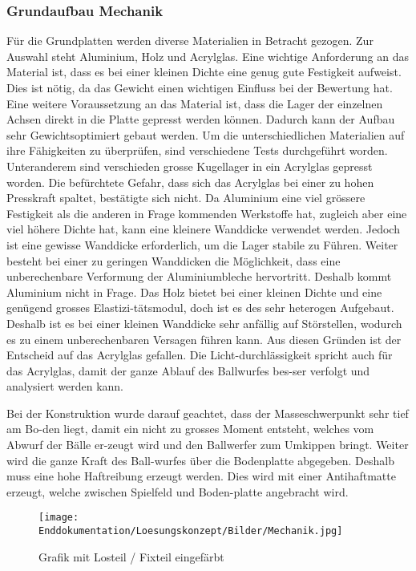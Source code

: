 ﻿\subsubsection{Grundaufbau Mechanik}
Für die Grundplatten werden diverse Materialien in Betracht gezogen. Zur Auswahl steht Aluminium, Holz und Acrylglas. Eine wichtige Anforderung an das Material ist, dass es bei einer kleinen Dichte eine genug gute Festigkeit aufweist. Dies ist nötig, da das Gewicht einen wichtigen Einfluss bei der Bewertung hat. Eine weitere Voraussetzung an das Material ist, dass die Lager der einzelnen Achsen direkt in die Platte gepresst werden können. Dadurch kann der Aufbau sehr Gewichtsoptimiert gebaut werden. Um die unterschiedlichen Materialien auf ihre Fähigkeiten zu überprüfen, sind verschiedene Tests durchgeführt worden. Unteranderem sind verschieden grosse Kugellager in ein Acrylglas gepresst worden. Die befürchtete Gefahr, dass sich das Acrylglas bei einer zu hohen Presskraft spaltet, bestätigte sich nicht. Da Aluminium eine viel grössere Festigkeit als die anderen in Frage kommenden Werkstoffe hat, zugleich aber eine viel höhere Dichte hat, kann eine kleinere Wanddicke verwendet werden. Jedoch ist eine gewisse Wanddicke erforderlich, um die Lager stabile zu Führen. Weiter besteht bei einer zu geringen Wanddicken die Möglichkeit, dass eine unberechenbare Verformung der Aluminiumbleche hervortritt. Deshalb kommt Aluminium nicht in Frage. Das Holz bietet bei einer kleinen Dichte und eine genügend grosses Elastizi-tätsmodul, doch ist es des sehr heterogen Aufgebaut. Deshalb ist es bei einer kleinen Wanddicke sehr anfällig auf Störstellen, wodurch es zu einem unberechenbaren Versagen führen kann. Aus diesen Gründen ist der Entscheid auf das Acrylglas gefallen. Die Licht-durchlässigkeit spricht auch für das Acrylglas, damit der ganze Ablauf des Ballwurfes bes-ser verfolgt und analysiert werden kann. 

Bei der Konstruktion wurde darauf geachtet, dass der Masseschwerpunkt sehr tief am Bo-den liegt, damit ein nicht zu grosses Moment entsteht, welches vom Abwurf der Bälle er-zeugt wird und den Ballwerfer zum Umkippen bringt. Weiter wird die ganze Kraft des Ball-wurfes über die Bodenplatte abgegeben. Deshalb muss eine hohe Haftreibung erzeugt werden. Dies wird mit einer Antihaftmatte erzeugt, welche zwischen Spielfeld und Boden-platte angebracht wird.
\begin{figure}
		\centering
		\texttt{[image: Enddokumentation/Loesungskonzept/Bilder/Mechanik.jpg]}
		\caption{Grafik mit Losteil / Fixteil eingefärbt}
		\label{fig:Mechanik}	
\end{figure}

